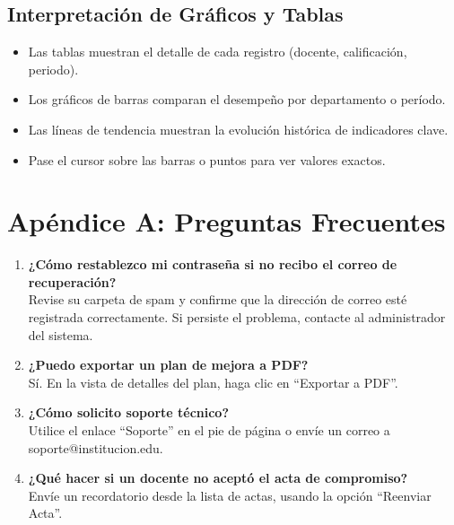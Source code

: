 \documentclass[12pt,a4paper]{book}
\begin{document}
\section{Interpretación de Gráficos y Tablas}
\begin{itemize}
    \item Las tablas muestran el detalle de cada registro (docente, calificación, periodo).
    \item Los gráficos de barras comparan el desempeño por departamento o período.
    \item Las líneas de tendencia muestran la evolución histórica de indicadores clave.
    \item Pase el cursor sobre las barras o puntos para ver valores exactos.
\end{itemize}
    
    \chapter*{Apéndice A: Preguntas Frecuentes}
\begin{enumerate}[label=\textbf{P\arabic*:}]
    \item \textbf{¿Cómo restablezco mi contraseña si no recibo el correo de recuperación?}\\
    Revise su carpeta de spam y confirme que la dirección de correo esté registrada correctamente. Si persiste el problema, contacte al administrador del sistema.
    \item \textbf{¿Puedo exportar un plan de mejora a PDF?}\\
    Sí. En la vista de detalles del plan, haga clic en “Exportar a PDF”.
    \item \textbf{¿Cómo solicito soporte técnico?}\\
    Utilice el enlace “Soporte” en el pie de página o envíe un correo a soporte@institucion.edu.
    \item \textbf{¿Qué hacer si un docente no aceptó el acta de compromiso?}\\
    Envíe un recordatorio desde la lista de actas, usando la opción “Reenviar Acta”.
\end{enumerate}
    
\end{document}
